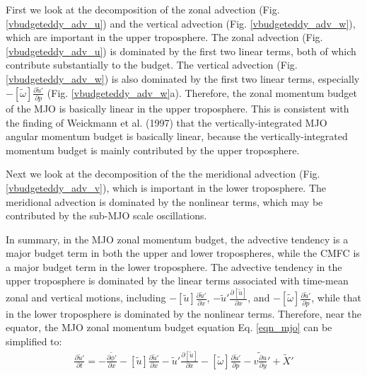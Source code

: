 \documentclass[12pt]{article}
\begin{document}
First we look at the decomposition of
the zonal advection (Fig. \ref{vbudgeteddy_adv_u})
and the vertical advection (Fig. \ref{vbudgeteddy_adv_w}), which are important
in the upper troposphere.
The zonal advection (Fig. \ref{vbudgeteddy_adv_u}) is dominated by the
first two linear terms, both of which contribute substantially to the budget.
The vertical advection (Fig. \ref{vbudgeteddy_adv_w}) is also dominated by
the first two linear terms, especially 
$- [\widetilde{\omega}] \frac{\partial
\widetilde{u}'}{\partial p}$ (Fig. \ref{vbudgeteddy_adv_w}a).  
Therefore, the zonal momentum budget of the MJO is basically linear in the
upper troposphere.
This is consistent with the finding of Weickmann et al. (1997) that 
the vertically-integrated MJO angular momentum budget is basically linear,
because the vertically-integrated momentum budget is mainly contributed
by the upper troposphere.

Next we look at the decomposition of the 
the meridional advection (Fig. \ref{vbudgeteddy_adv_v}), which is important
in the lower troposphere.
The meridional advection is dominated by the nonlinear terms, which may be
contributed by the sub-MJO scale oscillations.

In summary, in the MJO zonal momentum budget,
the advective tendency is a major budget term 
in both the upper and lower tropospheres, while the CMFC
is a major budget term in the lower troposphere.
The advective tendency in the upper troposphere is dominated by the linear terms
associated with time-mean zonal and vertical motions, including 
$- [\widetilde{u}] \frac{\partial \widetilde{u} '}{\partial x}$, 
$- \widetilde{u} ' \frac{\partial [\widetilde{u}]}{\partial x}$, and
$- [\widetilde{\omega}] \frac{\partial \widetilde{u} '}{\partial p}$,
while that in the lower troposphere is dominated by the nonlinear terms.
Therefore, near the equator, the MJO zonal momentum budget equation
Eq. \ref{eqn_mjo} can be simplified to:
\begin{eqnarray}
\frac{\partial \widetilde{u} '}{\partial t} =
- \frac{\partial \widetilde{\phi} '}{\partial x}
- [\widetilde{u}] \frac{\partial \widetilde{u} '}{\partial x}
- \widetilde{u} ' \frac{\partial [\widetilde{u}]}{\partial x}
- [\widetilde{\omega}] \frac{\partial \widetilde{u} '}{\partial p}
- \widetilde{v \frac{\partial u}{\partial y}} '
+ \widetilde{X} '
\label{eqn_mjo2}
\end{eqnarray}
\\

\end{document}
